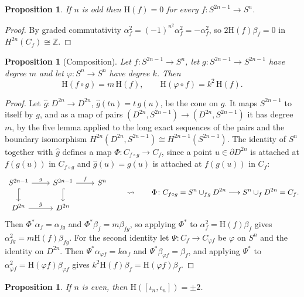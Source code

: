 \documentclass[11pt]{amsart}
\numberwithin{equation}{section}
\theoremstyle{plain}
\newtheorem{proposition}[theorem]{Proposition}
\theoremstyle{definition}
\theoremstyle{remark}
\newcommand{\Z}{\mathbb{Z}}
\newcommand{\Hopf}{\mathrm{H}}
\begin{document}
\begin{proposition}\label{prop:hodd}
If $n$ is odd then $\Hopf(f)=0$ for every $f\colon S^{2n-1}\to S^n$.
\end{proposition}

\begin{proof}
By graded commutativity $\alpha_f^2=(-1)^{n^2}\alpha_f^2=-\alpha_f^2$, so $2\Hopf(f)\beta_f=0$ in $H^{2n}(C_f)\cong\Z$.
\end{proof}

\begin{proposition}[Composition]\label{prop:composition}
Let $f\colon S^{2n-1}\to S^n$, let $g\colon S^{2n-1}\to S^{2n-1}$ have degree $m$ and let $\varphi\colon S^n\to S^n$ have degree $k$. Then
\[
\Hopf(f\circ g)=m\,\Hopf(f),\qquad \Hopf(\varphi\circ f)=k^2\,\Hopf(f).
\]
\end{proposition}

\begin{proof}
Let $\hat g\colon D^{2n}\to D^{2n}$, $\hat g(tu)=t\,g(u)$, be the cone on $g$. It maps $S^{2n-1}$ to itself by $g$, and as a map of pairs $(D^{2n},S^{2n-1})\to(D^{2n},S^{2n-1})$ it has degree $m$, by the five lemma applied to the long exact sequences of the pairs and the boundary isomorphism $H^{2n}(D^{2n},S^{2n-1})\cong H^{2n-1}(S^{2n-1})$. The identity of $S^n$ together with $\hat g$ defines a map $\Phi\colon C_{f\circ g}\to C_f$, since a point $u\in\partial D^{2n}$ is attached at $f(g(u))$ in $C_{f\circ g}$ and $\hat g(u)=g(u)$ is attached at $f(g(u))$ in $C_f$:
\[
\begin{tikzcd}
S^{2n-1}\arrow[r,"g"]\arrow[d,hook] & S^{2n-1}\arrow[d,hook]\arrow[r,"f"] & S^n\\
D^{2n}\arrow[r,"\hat g"] & D^{2n} &
\end{tikzcd}
\qquad\leadsto\qquad
\Phi\colon C_{f\circ g}=S^n\cup_{fg}D^{2n}\longrightarrow S^n\cup_fD^{2n}=C_f .
\]
Then $\Phi^*\alpha_f=\alpha_{fg}$ and $\Phi^*\beta_f=m\beta_{fg}$, so applying $\Phi^*$ to $\alpha_f^2=\Hopf(f)\beta_f$ gives $\alpha_{fg}^2=m\Hopf(f)\beta_{fg}$. For the second identity let $\Psi\colon C_f\to C_{\varphi f}$ be $\varphi$ on $S^n$ and the identity on $D^{2n}$. Then $\Psi^*\alpha_{\varphi f}=k\alpha_f$ and $\Psi^*\beta_{\varphi f}=\beta_f$, and applying $\Psi^*$ to $\alpha_{\varphi f}^2=\Hopf(\varphi f)\beta_{\varphi f}$ gives $k^2\Hopf(f)\beta_f=\Hopf(\varphi f)\beta_f$.
\end{proof}

\begin{proposition}\label{prop:whiteheadH}
If $n$ is even, then $\Hopf([\iota_n,\iota_n])=\pm2$.
\end{proposition}
\end{document}
